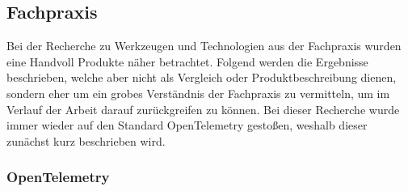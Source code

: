 %
%

\subsection{Fachpraxis}

Bei der Recherche zu Werkzeugen und Technologien aus der Fachpraxis wurden eine Handvoll Produkte näher betrachtet. Folgend werden die Ergebnisse beschrieben, welche aber nicht als Vergleich oder Produktbeschreibung dienen, sondern eher um ein grobes Verständnis der Fachpraxis zu vermitteln, um im Verlauf der Arbeit darauf zurückgreifen zu können. Bei dieser Recherche wurde immer wieder auf den Standard OpenTelemetry gestoßen, weshalb dieser zunächst kurz beschrieben wird.

\subsubsection{OpenTelemetry}

